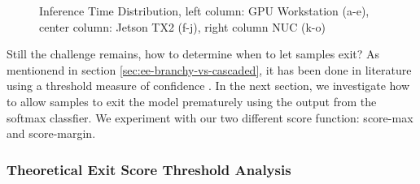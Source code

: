 \begin{figure}
\begin{minipage}{.33\textwidth}
		\hfill
		\hfill
	\end{minipage}
	\caption[Platform Inference Time of \gls{dnn}s]{Inference Time Distribution, left column: GPU Workstation (a-e), center column: Jetson TX2 (f-j), right column NUC (k-o)}
	\label{fig:inference-time-dist}
\end{figure}

Still the challenge remains, how to determine when to let samples exit? As mentionend in section \ref{sec:ee-branchy-vs-cascaded}, it has been done in literature using a threshold measure of confidence \cite{leroux_cascading_2017, teerapittayanon_branchynet:_2016}. In the next section, we investigate how to allow samples to exit the model prematurely using the output from the softmax classfier. We experiment with our two different score function: score-max and score-margin.

\subsubsection{Theoretical Exit Score Threshold Analysis}

